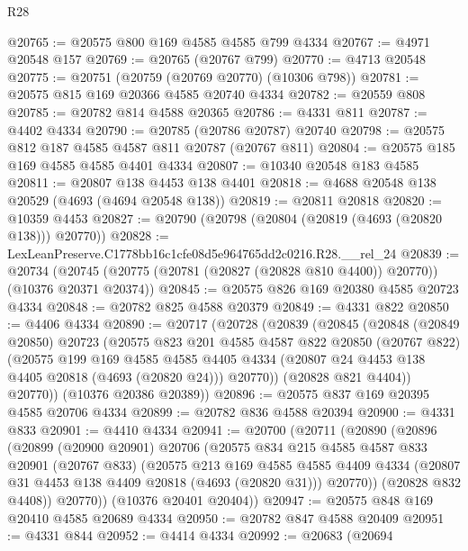 \begin{lexlean}{R28}
\begin{coremodule}
@20765 := @20575 @800 @169 @4585 @4585 @799 @4334
@20767 := @4971 @20548 @157
@20769 := @20765 (@20767 @799)
@20770 := @4713 @20548
@20775 := @20751 (@20759 (@20769 @20770) (@10306 @798))
@20781 := @20575 @815 @169 @20366 @4585 @20740 @4334
@20782 := @20559 @808
@20785 := @20782 @814 @4588 @20365
@20786 := @4331 @811
@20787 := @4402 @4334
@20790 := @20785 (@20786 @20787) @20740
@20798 := @20575 @812 @187 @4585 @4587 @811 @20787 (@20767 @811)
@20804 := @20575 @185 @169 @4585 @4585 @4401 @4334
@20807 := @10340 @20548 @183 @4585
@20811 := @20807 @138 @4453 @138 @4401
@20818 := @4688 @20548 @138 @20529 (@4693 (@4694 @20548 @138))
@20819 := @20811 @20818
@20820 := @10359 @4453
@20827 := @20790 (@20798 (@20804 (@20819 (@4693 (@20820 @138))) @20770))
@20828 := LexLeanPreserve.C1778bb16c1cfe08d5e964765dd2c0216.R28.__rel_24
@20839 := @20734
    (@20745 (@20775 (@20781 (@20827 (@20828 @810 @4400)) @20770)) (@10376 @20371 @20374))
@20845 := @20575 @826 @169 @20380 @4585 @20723 @4334
@20848 := @20782 @825 @4588 @20379
@20849 := @4331 @822
@20850 := @4406 @4334
@20890 := @20717
    (@20728
      (@20839
        (@20845
          (@20848
            (@20849 @20850)
            @20723
            (@20575
              @823
              @201
              @4585
              @4587
              @822
              @20850
              (@20767 @822)
              (@20575
                @199
                @169
                @4585
                @4585
                @4405
                @4334
                (@20807 @24 @4453 @138 @4405 @20818 (@4693 (@20820 @24)))
                @20770))
            (@20828 @821 @4404))
          @20770))
      (@10376 @20386 @20389))
@20896 := @20575 @837 @169 @20395 @4585 @20706 @4334
@20899 := @20782 @836 @4588 @20394
@20900 := @4331 @833
@20901 := @4410 @4334
@20941 := @20700
    (@20711
      (@20890
        (@20896
          (@20899
            (@20900 @20901)
            @20706
            (@20575
              @834
              @215
              @4585
              @4587
              @833
              @20901
              (@20767 @833)
              (@20575
                @213
                @169
                @4585
                @4585
                @4409
                @4334
                (@20807 @31 @4453 @138 @4409 @20818 (@4693 (@20820 @31)))
                @20770))
            (@20828 @832 @4408))
          @20770))
      (@10376 @20401 @20404))
@20947 := @20575 @848 @169 @20410 @4585 @20689 @4334
@20950 := @20782 @847 @4588 @20409
@20951 := @4331 @844
@20952 := @4414 @4334
@20992 := @20683
    (@20694

\end{coremodule}
\end{lexlean}
